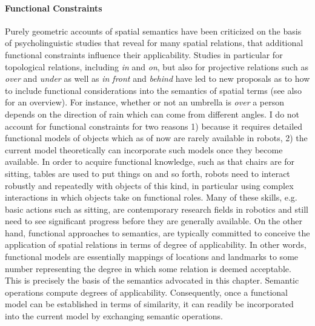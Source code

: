 \paragraph*{Functional Constraints}
Purely geometric accounts of spatial semantics have been criticized
on the basis of psycholinguistic studies that reveal for many spatial relations,
that additional functional constraints influence their applicability. 
Studies in particular for topological relations,
including \emph{in} and \emph{on}, but also for projective relations such as 
\emph{over} and \emph{under} \citep{coventry2001} as well as 
\emph{in front} and
\emph{behind} \citep{carlson1996influence}  have led to new
proposals \citep{coventry2005spatial} as to how to include functional
considerations into the semantics of spatial terms (see also 
\cite{coventry2004saying} for an overview). For instance, 
whether or not an umbrella is \emph{over} a person depends on 
the direction of rain which can come from different angles. 
I do not account for
functional constraints for two reasons 1) because it requires detailed
functional models of objects which as of now are rarely available
in robots, 2) the current model theoretically can incorporate such models
once they become available. In order to acquire functional 
knowledge, such as that chairs 
are for sitting, tables are used to put things on and so forth, 
robots need to interact robustly and repeatedly with objects 
of this kind, in particular using complex 
interactions in which objects take on functional roles. Many of
these skills, e.g. basic actions such as sitting,
are contemporary research fields in robotics and still need to see 
significant progress before they are generally 
available. On the other hand, functional approaches to semantics,
are typically committed to conceive the application of spatial
relations in terms of degree of applicability. In other words, 
functional models are essentially mappings of
locations and landmarks to some number representing the
degree in which some relation is deemed acceptable. This is 
precisely the basis of the semantics advocated in this chapter.
Semantic operations compute degrees of applicability. Consequently, 
once a functional model can be established in terms of similarity,
it can readily be incorporated into the current model by exchanging
semantic operations.

